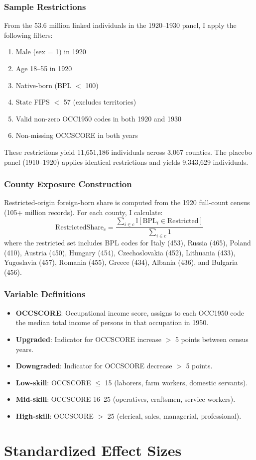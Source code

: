 \documentclass[12pt]{article}
\newcommand{\ind}{\mathbb{I}}
\begin{document}
\subsubsection*{Sample Restrictions} From the 53.6 million linked individuals in the 1920--1930 panel, I apply the following filters:
\begin{enumerate}
\item Male (sex = 1) in 1920
\item Age 18--55 in 1920
\item Native-born (BPL $<$ 100)
\item State FIPS $<$ 57 (excludes territories)
\item Valid non-zero OCC1950 codes in both 1920 and 1930
\item Non-missing OCCSCORE in both years
\end{enumerate}

These restrictions yield 11,651,186 individuals across 3,067 counties. The placebo panel (1910--1920) applies identical restrictions and yields 9,343,629 individuals.

\subsubsection*{County Exposure Construction} Restricted-origin foreign-born share is computed from the 1920 full-count census (105+ million records). For each county, I calculate:
$$\text{RestrictedShare}_c = \frac{\sum_{i \in c} \ind[\text{BPL}_i \in \text{Restricted}]}{\sum_{i \in c} 1}$$
where the restricted set includes BPL codes for Italy (453), Russia (465), Poland (410), Austria (450), Hungary (454), Czechoslovakia (452), Lithuania (433), Yugoslavia (457), Romania (455), Greece (434), Albania (436), and Bulgaria (456).

\subsubsection*{Variable Definitions}
\begin{itemize}
\item \textbf{OCCSCORE}: Occupational income score, assigns to each OCC1950 code the median total income of persons in that occupation in 1950.
\item \textbf{Upgraded}: Indicator for OCCSCORE increase $>$ 5 points between census years.
\item \textbf{Downgraded}: Indicator for OCCSCORE decrease $>$ 5 points.
\item \textbf{Low-skill}: OCCSCORE $\leq$ 15 (laborers, farm workers, domestic servants).
\item \textbf{Mid-skill}: OCCSCORE 16--25 (operatives, craftsmen, service workers).
\item \textbf{High-skill}: OCCSCORE $>$ 25 (clerical, sales, managerial, professional).
\end{itemize}


\section{Standardized Effect Sizes}
\label{sec:sde}


\end{document}
